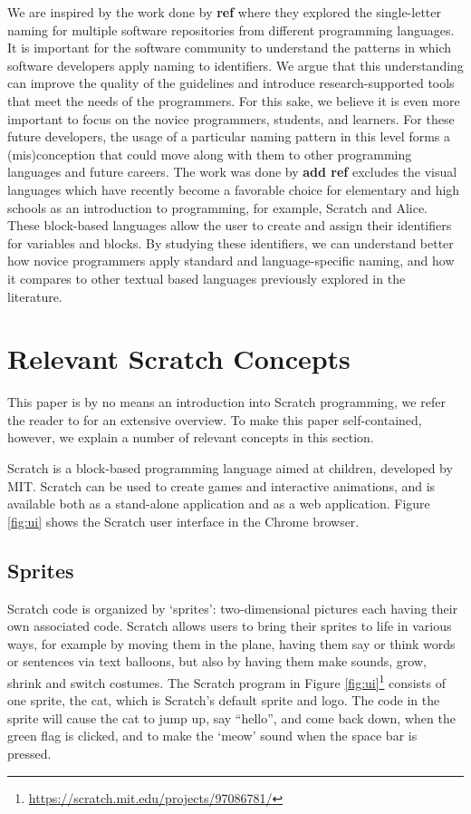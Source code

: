 \documentclass[conference]{IEEEtran}
\newcommand{\todo}[1]{ \textbf{#1} }
\begin{document}
We are inspired by the work done by \todo{ref} where they explored the single-letter naming for multiple software repositories from different programming languages. It is important for the software community to understand the patterns in which software developers apply naming to identifiers. We argue that this understanding can improve the quality of the guidelines and introduce research-supported tools that meet the needs of the programmers. For this sake, we believe it is even more important to focus on the novice programmers, students, and learners. For these future developers, the usage of a particular naming pattern in this level forms a (mis)conception that could move along with them to other programming languages and future careers. The work was done by \todo{add ref} excludes the visual languages which have recently become a favorable choice for elementary and high schools as an introduction to programming, for example, Scratch and Alice. These block-based languages allow the user to create and assign their identifiers for variables and blocks. By studying these identifiers, we can understand better how novice programmers apply standard and language-specific naming, and how it compares to other textual based languages previously explored in the literature. 

\section{Relevant Scratch Concepts}
\label{sec:scratch}
This paper is by no means an introduction into Scratch programming, we refer the reader to \cite{brennan_creative_2014} for an extensive overview. To make this paper self-contained, however, we explain a number of relevant concepts in this section. 

Scratch is a block-based programming language aimed at children, developed by MIT. Scratch can be used to create games and interactive animations, and is available both as a stand-alone application and as a web application. Figure \ref{fig:ui} shows the Scratch user interface in the Chrome browser.

\subsection{Sprites}
Scratch code is organized by `sprites': two-dimensional pictures each having their own associated code. Scratch allows users to bring their sprites to life in various ways, for example by moving them in the plane, having them say or think words or sentences via text balloons, but also by having them make sounds, grow, shrink and switch costumes. The Scratch program in Figure \ref{fig:ui}\footnote{\url{https://scratch.mit.edu/projects/97086781/}} consists of one sprite, the cat, which is Scratch's default sprite and logo. The code in the sprite will cause the cat to jump up, say ``hello'', and come back down, when the green flag is clicked, and to make the `meow' sound when the space bar is pressed.
\end{document}
